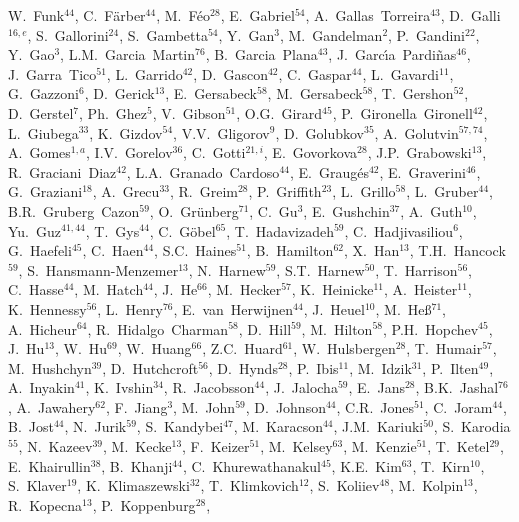 \begin{flushleft}
W.~Funk$^{44}$,
C.~F{\"a}rber$^{44}$,
M.~F{\'e}o$^{28}$,
E.~Gabriel$^{54}$,
A.~Gallas~Torreira$^{43}$,
D.~Galli$^{16,e}$,
S.~Gallorini$^{24}$,
S.~Gambetta$^{54}$,
Y.~Gan$^{3}$,
M.~Gandelman$^{2}$,
P.~Gandini$^{22}$,
Y.~Gao$^{3}$,
L.M.~Garcia~Martin$^{76}$,
B.~Garcia~Plana$^{43}$,
J.~Garc{\'\i}a~Pardi{\~n}as$^{46}$,
J.~Garra~Tico$^{51}$,
L.~Garrido$^{42}$,
D.~Gascon$^{42}$,
C.~Gaspar$^{44}$,
L.~Gavardi$^{11}$,
G.~Gazzoni$^{6}$,
D.~Gerick$^{13}$,
E.~Gersabeck$^{58}$,
M.~Gersabeck$^{58}$,
T.~Gershon$^{52}$,
D.~Gerstel$^{7}$,
Ph.~Ghez$^{5}$,
V.~Gibson$^{51}$,
O.G.~Girard$^{45}$,
P.~Gironella~Gironell$^{42}$,
L.~Giubega$^{33}$,
K.~Gizdov$^{54}$,
V.V.~Gligorov$^{9}$,
D.~Golubkov$^{35}$,
A.~Golutvin$^{57,74}$,
A.~Gomes$^{1,a}$,
I.V.~Gorelov$^{36}$,
C.~Gotti$^{21,i}$,
E.~Govorkova$^{28}$,
J.P.~Grabowski$^{13}$,
R.~Graciani~Diaz$^{42}$,
L.A.~Granado~Cardoso$^{44}$,
E.~Graug{\'e}s$^{42}$,
E.~Graverini$^{46}$,
G.~Graziani$^{18}$,
A.~Grecu$^{33}$,
R.~Greim$^{28}$,
P.~Griffith$^{23}$,
L.~Grillo$^{58}$,
L.~Gruber$^{44}$,
B.R.~Gruberg~Cazon$^{59}$,
O.~Gr{\"u}nberg$^{71}$,
C.~Gu$^{3}$,
E.~Gushchin$^{37}$,
A.~Guth$^{10}$,
Yu.~Guz$^{41,44}$,
T.~Gys$^{44}$,
C.~G{\"o}bel$^{65}$,
T.~Hadavizadeh$^{59}$,
C.~Hadjivasiliou$^{6}$,
G.~Haefeli$^{45}$,
C.~Haen$^{44}$,
S.C.~Haines$^{51}$,
B.~Hamilton$^{62}$,
X.~Han$^{13}$,
T.H.~Hancock$^{59}$,
S.~Hansmann-Menzemer$^{13}$,
N.~Harnew$^{59}$,
S.T.~Harnew$^{50}$,
T.~Harrison$^{56}$,
C.~Hasse$^{44}$,
M.~Hatch$^{44}$,
J.~He$^{66}$,
M.~Hecker$^{57}$,
K.~Heinicke$^{11}$,
A.~Heister$^{11}$,
K.~Hennessy$^{56}$,
L.~Henry$^{76}$,
E.~van~Herwijnen$^{44}$,
J.~Heuel$^{10}$,
M.~He{\ss}$^{71}$,
A.~Hicheur$^{64}$,
R.~Hidalgo~Charman$^{58}$,
D.~Hill$^{59}$,
M.~Hilton$^{58}$,
P.H.~Hopchev$^{45}$,
J.~Hu$^{13}$,
W.~Hu$^{69}$,
W.~Huang$^{66}$,
Z.C.~Huard$^{61}$,
W.~Hulsbergen$^{28}$,
T.~Humair$^{57}$,
M.~Hushchyn$^{39}$,
D.~Hutchcroft$^{56}$,
D.~Hynds$^{28}$,
P.~Ibis$^{11}$,
M.~Idzik$^{31}$,
P.~Ilten$^{49}$,
A.~Inyakin$^{41}$,
K.~Ivshin$^{34}$,
R.~Jacobsson$^{44}$,
J.~Jalocha$^{59}$,
E.~Jans$^{28}$,
B.K.~Jashal$^{76}$,
A.~Jawahery$^{62}$,
F.~Jiang$^{3}$,
M.~John$^{59}$,
D.~Johnson$^{44}$,
C.R.~Jones$^{51}$,
C.~Joram$^{44}$,
B.~Jost$^{44}$,
N.~Jurik$^{59}$,
S.~Kandybei$^{47}$,
M.~Karacson$^{44}$,
J.M.~Kariuki$^{50}$,
S.~Karodia$^{55}$,
N.~Kazeev$^{39}$,
M.~Kecke$^{13}$,
F.~Keizer$^{51}$,
M.~Kelsey$^{63}$,
M.~Kenzie$^{51}$,
T.~Ketel$^{29}$,
E.~Khairullin$^{38}$,
B.~Khanji$^{44}$,
C.~Khurewathanakul$^{45}$,
K.E.~Kim$^{63}$,
T.~Kirn$^{10}$,
S.~Klaver$^{19}$,
K.~Klimaszewski$^{32}$,
T.~Klimkovich$^{12}$,
S.~Koliiev$^{48}$,
M.~Kolpin$^{13}$,
R.~Kopecna$^{13}$,
P.~Koppenburg$^{28}$,

\end{flushleft}

